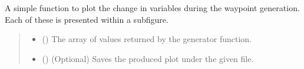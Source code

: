 \documentclass[letterpaper,10pt,english]{sphinxmanual}
\begin{document}
\begin{fulllineitems}
\label{\detokenize{modules/waypoints/generation:qnav.waypoints.generation.plot_figures}}
\pysigstartsignatures
{}
\pysigstopsignatures
\sphinxAtStartPar
A simple function to plot the change in variables during the waypoint
generation. Each of these is presented within a sub\sphinxhyphen{}figure.
\begin{quote}\begin{description}
\begin{itemize}
\item {} 
\sphinxAtStartPar
{} (\sphinxstyleliteralemphasis{\sphinxupquote{ (}}\sphinxstyleliteralemphasis{\sphinxupquote{)}}) \textendash{} The array of values returned by the generator
function.

\item {} 
\sphinxAtStartPar
{} () \textendash{} (Optional) Saves the produced plot under the given file.

\end{itemize}

\end{description}\end{quote}

\end{fulllineitems}

\end{document}
